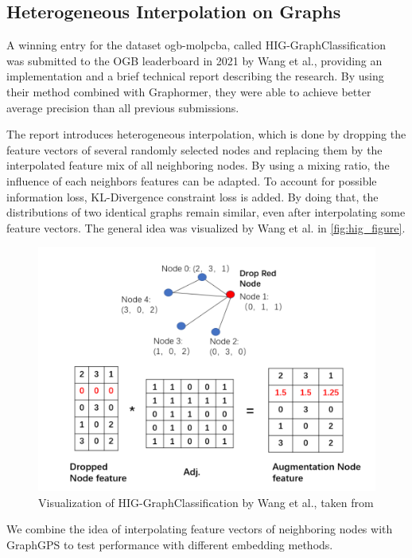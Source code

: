 \subsection{Heterogeneous Interpolation on Graphs}
A winning entry for the dataset ogb-molpcba, called HIG-GraphClassification~\cite{tencenc2021Hig,tencenc2021HigPaper} was submitted to the OGB leaderboard in 2021 by Wang et al., providing an implementation and a brief technical report describing the research. By using their method combined with Graphormer, they were able to achieve better average precision than all previous submissions.

The report introduces heterogeneous interpolation, which is done by dropping the feature vectors of several randomly selected nodes and replacing them by the interpolated feature mix of all neighboring nodes.
By using a mixing ratio, the influence of each neighbors features can be adapted. To account for possible information loss, KL-Divergence constraint loss is added. By doing that, the distributions of two identical graphs remain similar, even after interpolating some feature vectors. The general idea was visualized by Wang et al. in \autoref{fig:hig_figure}.

\begin{figure}[h!]
    \centering
    \includegraphics[scale=0.3]{tex/res/hig_figure.png}
    \caption{Visualization of HIG-GraphClassification by Wang et al., taken from \cite{tencenc2021HigPaper}}
    \label{fig:hig_figure}
\end{figure}

We combine the idea of interpolating feature vectors of neighboring nodes with GraphGPS to test performance with different embedding methods.
